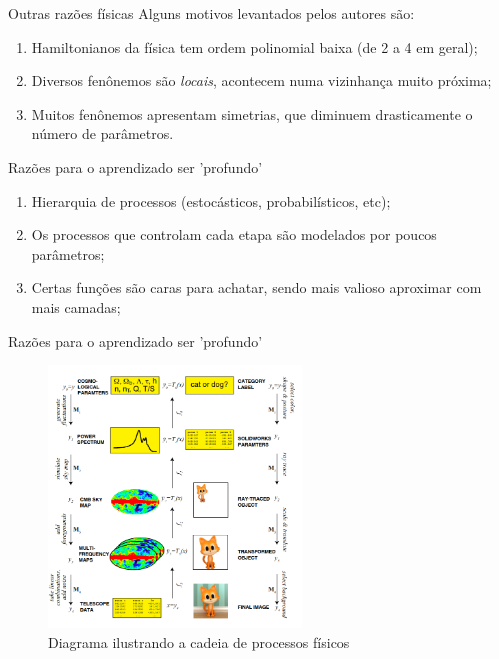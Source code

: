 \documentclass{beamer}
\begin{document}
\begin{frame}{Outras razões físicas}
    \small
    Alguns motivos levantados pelos autores são: \pause
    \begin{enumerate}
        \item Hamiltonianos da física tem ordem polinomial baixa (de 2 a 4 em geral); \pause
        \item Diversos fenônemos são \textit{locais}, acontecem numa vizinhança muito próxima; 
        \item Muitos fenônemos apresentam simetrias, que diminuem drasticamente o número de parâmetros.
    \end{enumerate}

\end{frame}

\begin{frame}{Razões para o aprendizado ser 'profundo'}
    \small
    \begin{enumerate}
        \item Hierarquia de processos (estocásticos, probabilísticos, etc); \pause
        \item Os processos que controlam cada etapa são modelados por poucos parâmetros; \pause
        \item Certas funções são caras para achatar, sendo mais valioso aproximar com mais camadas; 
    \end{enumerate}

\end{frame}

\begin{frame}{Razões para o aprendizado ser 'profundo'}
    \begin{figure}
        \includegraphics[width=0.6\textwidth]{fig/diagram.png}
        \caption{Diagrama ilustrando a cadeia de processos físicos}
    \end{figure}

\end{frame}
\end{document}
